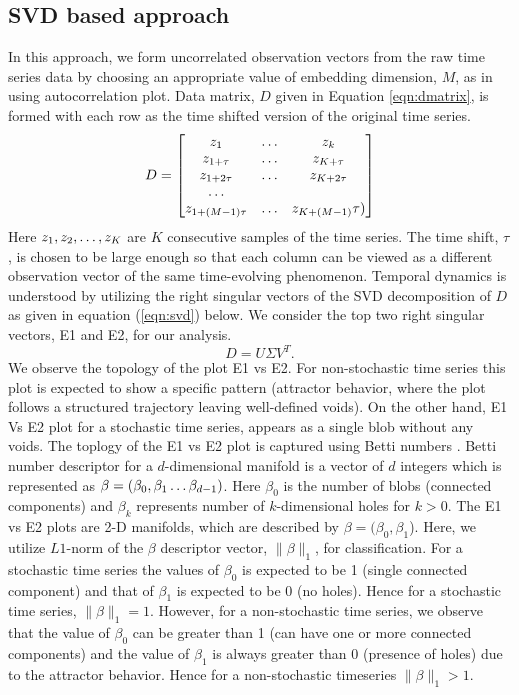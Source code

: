 \documentclass[journal]{IEEEtran}
\begin{document}
	\subsection{SVD based approach}
	In this approach, we form uncorrelated observation vectors from the raw time series data  by choosing an appropriate value of embedding dimension, $M$, as in \cite{misra2006} using autocorrelation plot. Data matrix, $D$ given in Equation \ref{eqn:dmatrix}, is formed with each row  as the  time shifted version of the original time series.
	\begin{equation} \label{eqn:dmatrix}
		D= \begin{bmatrix} z_1  & \mathellipsis & z_k \\
			   z_{1 + \tau} &  \mathellipsis & z_{K + \tau}\\
		       z_{1 + 2\tau} &  \mathellipsis &z_{K + 2\tau} \\
			   \mathellipsis \\
			   z_{1 + (M-1)\tau} & \mathellipsis & z_{K + (M-1)}\tau)\\
		\end{bmatrix}
		\end{equation}
	Here $z_{1}, z_{2}, \mathellipsis, z_{K}$ are $K$ consecutive samples of the time series. The time shift, $\tau$, is chosen to be large enough so that each column can be viewed as a different observation vector of the same time-evolving phenomenon. Temporal dynamics is understood by utilizing the right singular vectors of the SVD decomposition of $D$ as given in equation (\ref{eqn:svd}) below. We consider the top two right singular vectors, E1 and E2, for our analysis.
	\begin{equation}
		D = U \Sigma V^T.
		\label{eqn:svd}
	\end{equation}
	We observe the topology of the plot E1 vs E2. For non-stochastic time series this plot is expected to show a specific pattern (attractor behavior, where the plot follows a structured trajectory leaving  well-defined voids). On the other hand, E1 Vs E2 plot for a stochastic time series, appears as a single blob without any voids. The toplogy of the E1 vs E2 plot is  captured using Betti numbers \cite{jmlr}. Betti number descriptor for a $d$-dimensional manifold is a vector of $d$ integers which is represented as $\beta = (\beta_0, \beta_1 \mathellipsis \beta_{d-1})$. Here $\beta_{0}$ is the number of blobs (connected components) and $\beta_k$ represents number of $k$-dimensional holes for $k>0$.  The E1 vs E2 plots are 2-D manifolds, which are described by  $\beta=(\beta_{0}, \beta_{1}$). Here, we utilize $L1$-norm of the $\beta$ descriptor vector, $\|\beta\|_1$, for classification.  For a stochastic time series the values of $\beta_{0}$  is expected to be 1 (single connected component) and that of $\beta_1$ is expected to be 0 (no holes). Hence for a stochastic time series, $\|\beta\|_1 = 1$. However, for a non-stochastic time series, we observe that the value of $\beta_{0}$ can be greater than 1 (can have one or more connected components) and the value of $\beta_1$ is always greater than 0 (presence of holes) due to the attractor behavior. Hence for a non-stochastic timeseries $\|\beta\|_1 > 1$.
	
\end{document}
